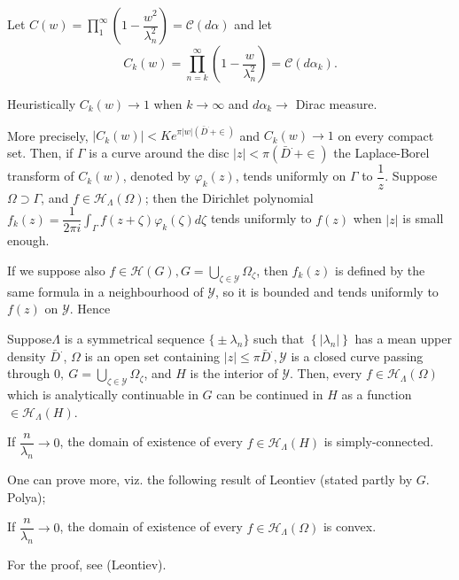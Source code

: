 Let $C(w) = \prod\limits_{1}^\infty \left(1 - \dfrac{w^2}{\lambda^2_n}\right) =
\mathscr{C} (d \alpha)$ and let 
$$
C_k (w) = \prod_{n = k}^{\infty} \left(1 -
\frac{w}{\lambda^2_n}\right) = \mathscr{C} (d \alpha_k). 
$$

Heuristically $C_k (w) \to 1$ when $k \to \infty$ and $d \alpha_k \to$
Dirac measure. 

More precisely, $\big | C_k(w) \big | < K e^{\pi |w| (\bar{D}^. +
 \in )}$ and $C_k (w) \to 1$ on every compact set. Then, if
$\Gamma$ is a curve around the disc $|z| < \pi (\bar{D}^. +
\in )$ the Laplace-Borel transform of $C_k (w)$, denoted by
$\varphi_k (z)$, tends uniformly on $\Gamma$ to
$\dfrac{1}{z}$. Suppose $\Omega \supset \Gamma$, and $f \in
\mathscr{H}_\Lambda (\Omega)$; then the Dirichlet polynomial $f_k (z)
= \dfrac{1}{2 \pi i} \int_\Gamma f(z + \zeta) \varphi_k (\zeta) d
\zeta$ tends uniformly to $f(z)$ when $\big | z \big |$ is small
enough. 

If we suppose also $f \in \mathscr{H} (G), G = \bigcup\limits_{\zeta
 \in \mathscr{Y}} \Omega_\zeta$, then $f_k (z)$ is defined by the
same formula in a neighbourhood of $\mathscr{Y}$, so it is bounded and
tends uniformly to $f(z) $ on $\mathscr{Y}$. Hence 

\begin{theorem*} %
 Suppose\pageoriginale $\Lambda$ is a symmetrical sequence $\big \{ \pm \lambda_n
 \big\}$ such that $\left \{ \big | \lambda_n \big | \right\}$ has a
 mean upper density $\bar{D}^.$, $\Omega$ is an open set containing $|
 z | \le \pi \bar{D}^., \mathscr{Y}$ is a closed curve passing through
 $0, ~ G = \bigcup\limits_{\zeta \in \mathscr{Y}} \Omega_\zeta$, and
 $H$ is the interior of $\mathscr{Y}$. Then, every $f \in
 \mathscr{H}_\Lambda (\Omega)$ which is analytically continuable in
 $G$ can be continued in $H$ as a function $\in \mathscr{H}_\Lambda
 (H)$. 
\end{theorem*}

\begin{coro*} %
 If $\dfrac{n}{\lambda_n} \to 0$, the domain of existence of every $f
 \in \mathscr{H}_\Lambda (H)$ is simply-connected. 
\end{coro*}

One can prove more, viz. the following result of Leontiev (stated
partly by $G$. Polya); 
\begin{theorem*} %
 If $\dfrac{n}{\lambda_n} \to 0$, the domain of existence of every $f
 \in \mathscr{H}_\Lambda (\Omega)$ is convex. 
\end{theorem*}

For the proof, see (Leontiev).
